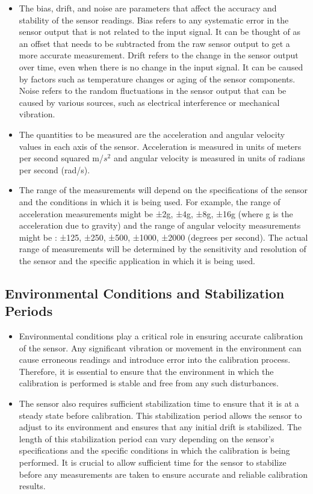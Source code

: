 \begin{itemize}
	\item The bias, drift, and noise are parameters that affect the accuracy and stability of the sensor readings. Bias refers to any systematic error in the sensor output that is not related to the input signal. It can be thought of as an offset that needs to be subtracted from the raw sensor output to get a more accurate measurement. Drift refers to the change in the sensor output over time, even when there is no change in the input signal. It can be caused by factors such as temperature changes or aging of the sensor components. Noise refers to the random fluctuations in the sensor output that can be caused by various sources, such as electrical interference or mechanical vibration.
	\item The quantities to be measured are the acceleration and angular velocity values in each axis of the sensor. Acceleration is measured in units of meters per second squared m/\(s^2\) and angular velocity is measured in units of radians per second (rad/s).
	\item The range of the measurements will depend on the specifications of the sensor and the conditions in which it is being used. For example, the range of acceleration measurements might be ±2g, ±4g, ±8g, ±16g  (where g is the acceleration due to gravity) and the range of angular velocity measurements might be : ±125, ±250, ±500, ±1000, ±2000 (degrees per second). The actual range of measurements will be determined by the sensitivity and resolution of the sensor and the specific application in which it is being used.
\end{itemize}

\subsection{Environmental Conditions and Stabilization Periods}

\begin{itemize}
	\item Environmental conditions play a critical role in ensuring accurate calibration of the sensor. Any significant vibration or movement in the environment can cause erroneous readings and introduce error into the calibration process. Therefore, it is essential to ensure that the environment in which the calibration is performed is stable and free from any such disturbances.
	\item The sensor also requires sufficient stabilization time to ensure that it is at a steady state before calibration. This stabilization period allows the sensor to adjust to its environment and ensures that any initial drift is stabilized. The length of this stabilization period can vary depending on the sensor's specifications and the specific conditions in which the calibration is being performed. It is crucial to allow sufficient time for the sensor to stabilize before any measurements are taken to ensure accurate and reliable calibration results.
\end{itemize}


